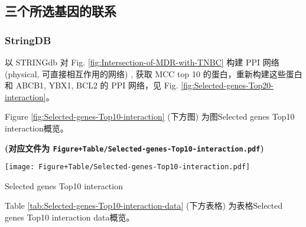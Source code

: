 \documentclass[
]{article}
\begin{document}
\begin{center}\vspace{1.5cm}\end{center}

\hypertarget{others}{%
\subsection{三个所选基因的联系}\label{others}}

\hypertarget{stringdb}{%
\subsubsection{StringDB}\label{stringdb}}

以 STRINGdb 对 Fig. \ref{fig:Intersection-of-MDR-with-TNBC} 构建 PPI 网络 (physical, 可直接相互作用的网络) ,
获取 MCC top 10 的蛋白，重新构建这些蛋白和 ABCB1, YBX1, BCL2 的 PPI 网络，见
Fig. \ref{fig:Selected-genes-Top20-interaction}。

\begin{center}\vspace{1.5cm}\end{center}

Figure \ref{fig:Selected-genes-Top10-interaction} (下方图) 为图Selected genes Top10 interaction概览。

\textbf{(对应文件为 \texttt{Figure+Table/Selected-genes-Top10-interaction.pdf})}

\def\@captype{figure}
\begin{center}
\texttt{[image: Figure+Table/Selected-genes-Top10-interaction.pdf]}
\caption{Selected genes Top10 interaction}\label{fig:Selected-genes-Top10-interaction}
\end{center}

\begin{center}\vspace{1.5cm}\end{center}

\begin{center}\vspace{1.5cm}\end{center}

Table \ref{tab:Selected-genes-Top10-interaction-data} (下方表格) 为表格Selected genes Top10 interaction data概览。
\end{document}
